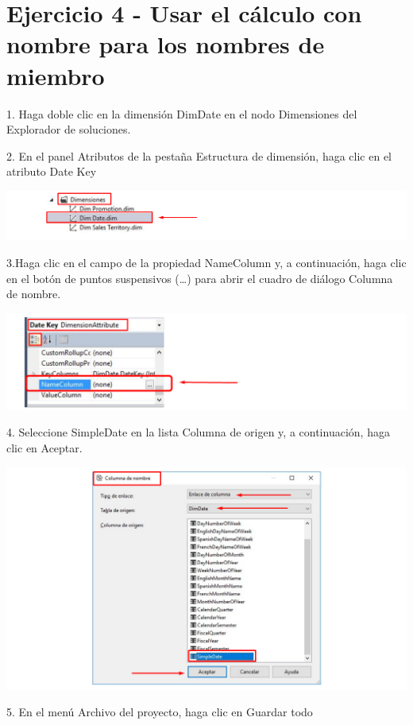 \section{Ejercicio 4 - Usar el cálculo con nombre para los nombres de miembro}  

1. Haga doble clic en la dimensión DimDate en el nodo Dimensiones del Explorador de soluciones.

2. En el panel Atributos de la pestaña Estructura de dimensión, haga clic en el atributo Date Key

	\begin{center}
	\includegraphics[width=\columnwidth]{images/task4/img1}
	\end{center}	

3.Haga clic en el campo de la propiedad NameColumn y, a continuación, haga clic en el botón de puntos suspensivos
(…) para abrir el cuadro de diálogo Columna de nombre.
	\begin{center}
	\includegraphics[width=\columnwidth]{images/task4/img2}
	\end{center}	

4. Seleccione SimpleDate en la lista Columna de origen y, a continuación, haga clic en Aceptar.

	\begin{center}
	\includegraphics[width=\columnwidth]{images/task4/img3}
	\end{center}	

5. En el menú Archivo del proyecto, haga clic en Guardar todo

    